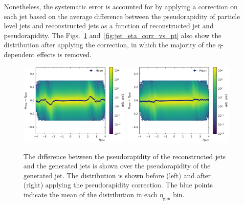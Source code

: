 Nonetheless, the systematic error is accounted for by applying a correction on
each jet based on the average difference between the pseudorapidity of particle
level jets and reconstructed jets as a function of reconstructed jet \pt and
pseudorapidity. The Figs.~\ref{fig:jet_eta_corr}
and~\ref{fig:jet_eta_corr_vs_pt} also show the distribution after applying the
correction, in which the majority of the $\eta$-dependent effects is removed.

\begin{figure}[htbp]
    \centering
    \includegraphics[width=0.49\textwidth]{figures/measurement/genvsreco_eta.pdf}\hfill
    \includegraphics[width=0.49\textwidth]{figures/measurement/genvsreco_eta_corr.pdf}
    \caption[Differences of pseudorapidity of reconstructed jets to
        particle level jets]{The difference between the pseudorapidity of the
            reconstructed jets and the generated jets is shown over the
            pseudorapidity of the generated jet. The distribution is shown
            before (left) and after (right) applying the pseudorapidity
            correction. The blue points indicate the mean of the distribution in
            each $\eta_{\mathrm{gen}}$ bin.}
    \label{fig:jet_eta_corr}
\end{figure}


